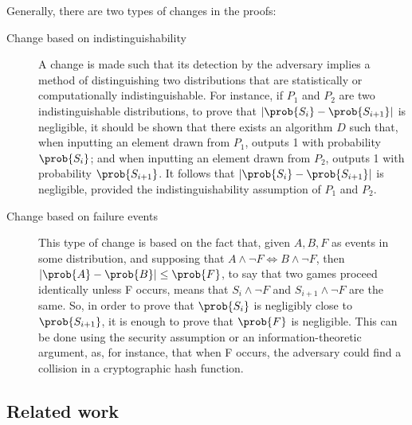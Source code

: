 Generally, there are two types of changes in the proofs:
\begin{description}
\item[Change based on indistinguishability] A change is made such that its detection by the adversary implies a method of distinguishing two
  distributions that are statistically or computationally indistinguishable. For
  instance, if $P_{1}$ and $P_{2}$ are two indistinguishable distributions,
  to prove that $|\prob{S_{i}} - \prob{S_{i+1}}|$ is negligible, it should be shown
  that there exists an algorithm $D$ such that, when inputting an
  element drawn from $P_{1}$, outputs 1 with probability $\prob{S_{i}}$; and
  when inputting an element drawn from $P_{2}$, outputs 1 with
  probability $\prob{S_{i+1}}$. It follows that
  $|\prob{S_{i}} - \prob{S_{i+1}}|$ is negligible, provided the
  indistinguishability assumption of $P_{1}$ and $P_{2}$.
\item[Change based on failure events] This type of change is based on the fact
  that, given $A,B,F$ as events in some distribution, and supposing that
  $A \wedge \neg F \iff B \wedge \neg F$, then
  $|\prob{A} - \prob{B}| \leq \prob{F}$, to say that two games proceed
  identically unless F occurs, means that $S_{i} \wedge \neg F$ and
  $S_{i+1} \wedge \neg F$ are the same. So, in order to prove that $\prob{S_{i}}$ is
  negligibly close to $\prob{S_{i+1}}$, it is enough to prove that $\prob{F}$ is
  negligible. This can be done using the security assumption or an
  information-theoretic argument, as, for instance, that when F occurs, the adversary
  could find a collision in a cryptographic hash function.
\end{description}

\subsection{Related work}
\label{sec:proofRelatedWork}

